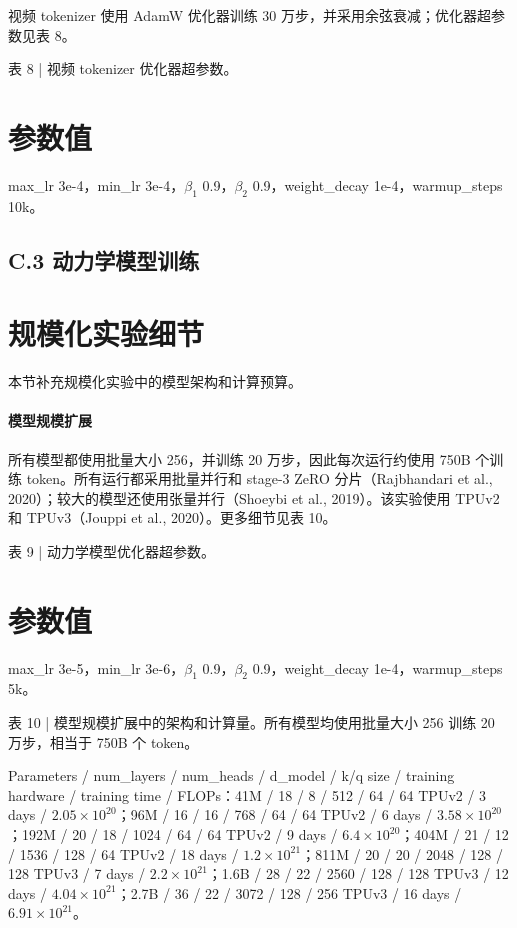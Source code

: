 \documentclass[10pt]{article}
\begin{document}
视频 tokenizer 使用 AdamW 优化器训练 30 万步，并采用余弦衰减；优化器超参数见表 8。

表 8 | 视频 tokenizer 优化器超参数。

\section*{参数值}
max\_lr 3e-4，min\_lr 3e-4，$\beta_1$ 0.9，$\beta_2$ 0.9，weight\_decay 1e-4，warmup\_steps 10k。

\subsection*{C.3 动力学模型训练}

\section*{规模化实验细节}
本节补充规模化实验中的模型架构和计算预算。

\paragraph{模型规模扩展}
所有模型都使用批量大小 256，并训练 20 万步，因此每次运行约使用 750B 个训练 token。所有运行都采用批量并行和 stage-3 ZeRO 分片（Rajbhandari et al., 2020）；较大的模型还使用张量并行（Shoeybi et al., 2019）。该实验使用 TPUv2 和 TPUv3（Jouppi et al., 2020）。更多细节见表 10。

表 9 | 动力学模型优化器超参数。

\section*{参数值}
max\_lr 3e-5，min\_lr 3e-6，$\beta_1$ 0.9，$\beta_2$ 0.9，weight\_decay 1e-4，warmup\_steps 5k。

表 10 | 模型规模扩展中的架构和计算量。所有模型均使用批量大小 256 训练 20 万步，相当于 750B 个 token。

Parameters / num\_layers / num\_heads / d\_model / k/q size / training hardware / training time / FLOPs：41M / 18 / 8 / 512 / 64 / 64 TPUv2 / 3 days / $2.05 \times 10^{20}$；96M / 16 / 16 / 768 / 64 / 64 TPUv2 / 6 days / $3.58 \times 10^{20}$；192M / 20 / 18 / 1024 / 64 / 64 TPUv2 / 9 days / $6.4 \times 10^{20}$；404M / 21 / 12 / 1536 / 128 / 64 TPUv2 / 18 days / $1.2 \times 10^{21}$；811M / 20 / 20 / 2048 / 128 / 128 TPUv3 / 7 days / $2.2 \times 10^{21}$；1.6B / 28 / 22 / 2560 / 128 / 128 TPUv3 / 12 days / $4.04 \times 10^{21}$；2.7B / 36 / 22 / 3072 / 128 / 256 TPUv3 / 16 days / $6.91 \times 10^{21}$。
\end{document}
